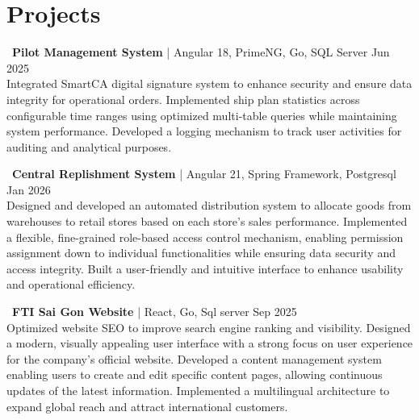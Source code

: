 \documentclass[letterpaper,11pt]{article}
\begin{document}
\section{Projects}

\textbullet\ \textbf{Pilot Management System} | Angular 18, PrimeNG, Go, SQL Server \hfill Jun 2025\\
Integrated SmartCA digital signature system to enhance security and ensure data integrity for operational orders. Implemented ship plan statistics across configurable time ranges using optimized multi-table queries while maintaining system performance. Developed a logging mechanism to track user activities for auditing and analytical purposes.

\vspace{6pt}

\textbullet\ \textbf{Central Replishment System} | Angular 21, Spring Framework, Postgresql \hfill Jan 2026\\
Designed and developed an automated distribution system to allocate goods from warehouses to retail stores based on each store’s sales performance. Implemented a flexible, fine-grained role-based access control mechanism, enabling permission assignment down to individual functionalities while ensuring data security and access integrity. Built a user-friendly and intuitive interface to enhance usability and operational efficiency.

\vspace{6pt}

\textbullet\ \textbf{FTI Sai Gon Website} | React, Go, Sql server \hfill Sep 2025\\
Optimized website SEO to improve search engine ranking and visibility. Designed a modern, visually appealing user interface with a strong focus on user experience for the company’s official website. Developed a content management system enabling users to create and edit specific content pages, allowing continuous updates of the latest information. Implemented a multilingual architecture to expand global reach and attract international customers.
\end{document}
